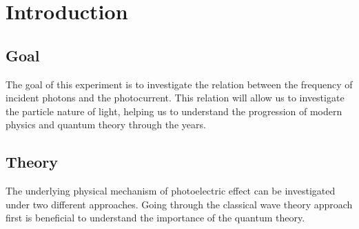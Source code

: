 \section{Introduction}

	\subsection{Goal}
		The goal of this experiment is to investigate the relation between the frequency of incident photons and the photocurrent. This relation will allow us to investigate the particle nature of light, helping us to understand the progression of modern physics and quantum theory through the years.
	
	\subsection{Theory}
		The underlying physical mechanism of photoelectric effect can be investigated under two different approaches. Going through the classical wave theory approach first is beneficial to understand the importance of the quantum theory.
